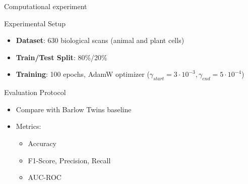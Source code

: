\documentclass{beamer}
\begin{document}
\begin{frame}{Computational experiment}
\begin{block}{Experimental Setup}
\begin{itemize}
    \item \textbf{Dataset}: 630 biological scans (animal and plant cells)
    \item \textbf{Train/Test Split}: 80\%/20\%
    \item \textbf{Training}: 100 epochs, AdamW optimizer ($\gamma_{start}=3\cdot10^{-3}, \gamma_{end}=5\cdot10^{-4}$)
\end{itemize}
\end{block}

\begin{block}{Evaluation Protocol}
\begin{itemize}
    \item Compare with Barlow Twins baseline
    \item Metrics:
    \begin{itemize}
        \item Accuracy 
        \item F1-Score, Precision, Recall
        \item AUC-ROC
    \end{itemize}
\end{itemize}
\end{block}
\end{frame}

\end{document}
